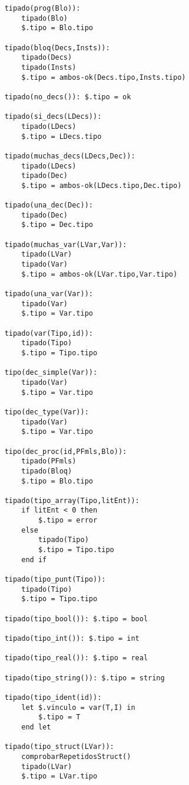 
\begin{lstlisting}
    tipado(prog(Blo)):
        tipado(Blo)
        $.tipo = Blo.tipo

    tipado(bloq(Decs,Insts)):
        tipado(Decs)
        tipado(Insts)
        $.tipo = ambos-ok(Decs.tipo,Insts.tipo)

    tipado(no_decs()): $.tipo = ok
    
    tipado(si_decs(LDecs)):
        tipado(LDecs)
        $.tipo = LDecs.tipo

    tipado(muchas_decs(LDecs,Dec)):
        tipado(LDecs)
        tipado(Dec)
        $.tipo = ambos-ok(LDecs.tipo,Dec.tipo)
    
    tipado(una_dec(Dec)):
        tipado(Dec)
        $.tipo = Dec.tipo

    tipado(muchas_var(LVar,Var)):
        tipado(LVar)
        tipado(Var)
        $.tipo = ambos-ok(LVar.tipo,Var.tipo)

    tipado(una_var(Var)):
        tipado(Var)
        $.tipo = Var.tipo
    
    tipado(var(Tipo,id)):
        tipado(Tipo)
        $.tipo = Tipo.tipo

    tipo(dec_simple(Var)):
        tipado(Var)
        $.tipo = Var.tipo

    tipo(dec_type(Var)):
        tipado(Var)
        $.tipo = Var.tipo
    
    tipo(dec_proc(id,PFmls,Blo)):
        tipado(PFmls)
        tipado(Bloq)
        $.tipo = Blo.tipo

    tipado(tipo_array(Tipo,litEnt)):
        if litEnt < 0 then
            $.tipo = error
        else
            tipado(Tipo)
            $.tipo = Tipo.tipo 
        end if

    tipado(tipo_punt(Tipo)):
        tipado(Tipo)
        $.tipo = Tipo.tipo

    tipado(tipo_bool()): $.tipo = bool

    tipado(tipo_int()): $.tipo = int

    tipado(tipo_real()): $.tipo = real

    tipado(tipo_string()): $.tipo = string

    tipado(tipo_ident(id)):
        let $.vinculo = var(T,I) in
            $.tipo = T
        end let

    tipado(tipo_struct(LVar)):
        comprobarRepetidosStruct()
        tipado(LVar)
        $.tipo = LVar.tipo


\end{lstlisting}
